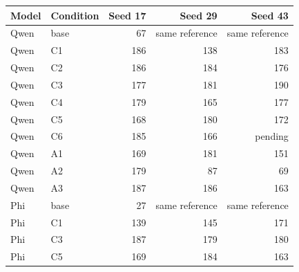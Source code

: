 \begin{tabular}{llrrr}
\toprule
Model & Condition & Seed 17 & Seed 29 & Seed 43 \\
\midrule
Qwen & base & 67 & same reference & same reference \\
Qwen & C1 & 186 & 138 & 183 \\
Qwen & C2 & 186 & 184 & 176 \\
Qwen & C3 & 177 & 181 & 190 \\
Qwen & C4 & 179 & 165 & 177 \\
Qwen & C5 & 168 & 180 & 172 \\
Qwen & C6 & 185 & 166 & pending \\
Qwen & A1 & 169 & 181 & 151 \\
Qwen & A2 & 179 & 87 & 69 \\
Qwen & A3 & 187 & 186 & 163 \\
Phi & base & 27 & same reference & same reference \\
Phi & C1 & 139 & 145 & 171 \\
Phi & C3 & 187 & 179 & 180 \\
Phi & C5 & 169 & 184 & 163 \\
\bottomrule
\end{tabular}